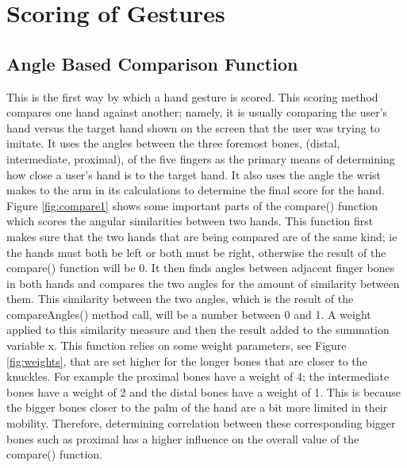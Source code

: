 \chapter{Scoring of Gestures}

\label{Chapter5_scoring} 

\section{Angle Based Comparison Function}
This is the first way by which a hand gesture is scored. This scoring method compares one hand against another; namely, it is usually comparing the user's hand versus the target hand shown on the screen that the user was trying to imitate. It uses the angles between the three foremost bones, (distal, intermediate, proximal), of the five fingers as the primary means of determining how close a user's hand is to the target hand. It also uses the angle the wrist makes to the arm in its calculations to determine the final score for the hand. Figure \ref{fig:compare1} shows some important parts of the compare() function which scores the angular similarities between two hands. This function first makes sure that the two hands that are being compared are of the same kind; ie the hands must both be left or both must be right, otherwise the result of the compare() function will be 0. It then finds angles between adjacent finger bones in both hands and compares the two angles for the amount of similarity between them. This similarity between the two angles, which is the result of the compareAngles() method call, will be a number between 0 and 1. A weight applied to this similarity measure and then the result added to the summation variable x. This function relies on some weight parameters, see Figure \ref{fig:weights}, that are set higher for the longer bones that are closer to the knuckles. For example the proximal bones have a weight of 4; the intermediate bones have a weight of 2 and the distal bones have a weight of 1. This is because the bigger bones closer to the palm of the hand are a bit more limited in their mobility. Therefore, determining correlation between these corresponding bigger bones such as proximal has a higher influence on the overall value of the compare() function. 
